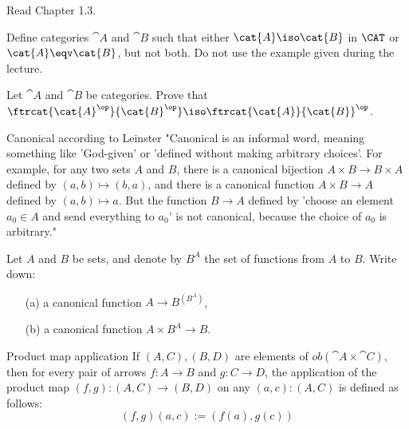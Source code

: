 \def\pathToRoot{../../}



\author{Joachim Bard, Maximilian Wuttke, Nikita Ziuzin}


\begin{hint}
  Read Chapter 1.3.
\end{hint}

\begin{exercise}
  Define categories $\cat{A}$ and $\cat{B}$ such that either $\cat{A} \iso \cat{B}$ in $\CAT$ or $\cat{A} \eqv \cat{B}$, but not both.
  Do not use the example given during the lecture.
\end{exercise}

\begin{exercise}
        Let $\cat{A}$ and $\cat{B}$ be categories.  Prove that
        $\ftrcat{\cat{A}^\op}{\cat{B}^\op} \iso \ftrcat{\cat{A}}{\cat{B}}^\op$.
\end{exercise}

\begin{definition}{Canonical according to Leinster}
  "Canonical is an informal word, meaning something like 'God-given' or
  'defined without making arbitrary choices'.  For example, for any two sets
  $A$ and $B$, there is a canonical bijection $A \times B \to B \times A$
  defined by $(a, b) \mapsto (b, a)$, and there is a canonical function $A
  \times B \to A$ defined by $(a, b) \mapsto a$.  But the function $B \to A$
  defined by 'choose an element $a_0 \in A$ and send everything to $a_0$' is
  not canonical, because the choice of $a_0$ is arbitrary."
\end{definition}

\begin{exercise}
  Let $A$ and $B$ be sets, and denote by $B^A$ the set of functions from $A$
  to $B$.  Write down:
  \begin{itemize}
  \item[(a)] a canonical function $A \to B^{(B^A)}$,
  \item[(b)] a canonical function $A \times B^{A} \to B$.
  \end{itemize}
\end{exercise}

\begin{definition}{Product map application}
  If $(A, C), (B, D)$ are elements of $ob(\cat{A} \times \cat{C})$, then for
  every pair of arrows $f: A \to B$ and $g: C \to D$, the application of the
  product map $(f, g): (A, C) \to (B, D)$ on any $(a, c): (A, C)$ is defined
  as follows:
  \begin{equation*}
    (f, g) (a, c) := (f(a), g(c))
  \end{equation*}
\end{definition}

